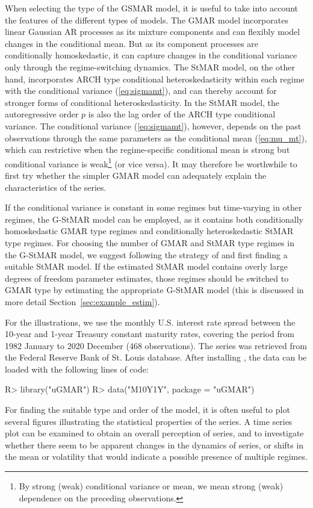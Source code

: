 \documentclass[nojss]{jss} %
\begin{document}
When selecting the type of the GSMAR model, it is useful to take into account the features of the different types of models. The GMAR model incorporates linear Gaussian AR processes as its mixture components and can flexibly model changes in the conditional mean. But as its component processes are conditionally homoskedastic, it can capture changes in the conditional variance only through the regime-switching dynamics. The StMAR model, on the other hand, incorporates ARCH type conditional heteroskedasticity within each regime with the conditional variance (\ref{eq:sigmamt}), and can thereby account for stronger forms of conditional heteroskedasticity. In the StMAR model, the autoregressive order $p$ is also the lag order of the ARCH type conditional variance. The conditional variance (\ref{eq:sigmamt}), however, depends on the past observations through the same parameters as the conditional mean (\ref{eq:mu_mt}), which can restrictive when the regime-specific conditional mean is strong but conditional variance is weak\footnote{By strong (weak) conditional variance or mean, we mean strong (weak) dependence on the preceding observations.} (or vice versa). It may therefore be worthwhile to first try whether the simpler GMAR model can adequately explain the characteristics of the series.

If the conditional variance is constant in some regimes but time-varying in other regimes, the G-StMAR model can be employed, as it contains both conditionally homoskedastic GMAR type regimes and conditionally heteroskedastic StMAR type regimes. For choosing the number of GMAR and StMAR type regimes in the G-StMAR model, we suggest following the strategy of \citet[Section 4]{Virolainen:2020} and first finding a suitable StMAR model. If the estimated StMAR model contains overly large degrees of freedom parameter estimates, those regimes should be switched to GMAR type by estimating the appropriate G-StMAR model (this is discussed in more detail Section~\ref{sec:example_estim}).

For the illustrations, we use the monthly U.S. interest rate spread between the 10-year and 1-year Treasury constant maturity rates, covering the period from 1982 January to 2020 December (468 observations). The series was retrieved from the Federal Reserve Bank of St. Louis database. After installing , the data can be loaded with the following lines of code:
%
\begin{CodeChunk}
\begin{CodeInput}
R> library("uGMAR")
R> data("M10Y1Y", package = "uGMAR")
\end{CodeInput}
\end{CodeChunk}
%
For finding the suitable type and order of the model, it is often useful to plot several figures illustrating the statistical properties of the series. A time series plot can be examined to obtain an overall perception of series, and to investigate whether there seem to be apparent changes in the dynamics of series, or shifts in the mean or volatility that would indicate a possible presence of multiple regimes.
\end{document}
